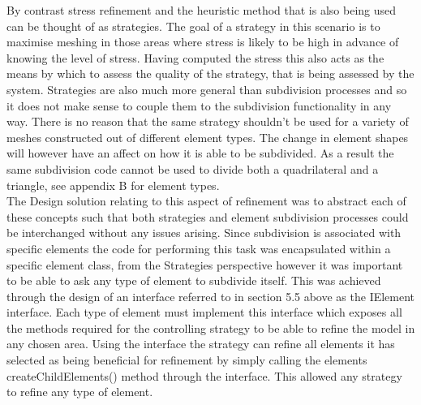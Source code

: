 \noindent
By contrast stress refinement and the heuristic method that is also being used can be thought of as strategies. The goal of a strategy in this scenario is to maximise meshing in those areas where stress is likely to be high in advance of knowing the level of stress. Having computed the stress this also acts as the means by which to assess the quality of the strategy, that is being assessed by the system. Strategies are also much more general than subdivision processes and so it does not make sense to couple them to the subdivision functionality in any way. There is no reason that the same strategy shouldn't be used for a variety of meshes constructed out of different element types. The change in element shapes will however have an affect on how it is able to be subdivided. As a result the same subdivision code cannot be used to divide both a quadrilateral and a triangle, see appendix B for element types. \\ 


\noindent
The Design solution relating to this aspect of refinement was to abstract each of these concepts such that both strategies and element subdivision processes could be interchanged without any issues arising. Since subdivision is associated with specific elements the code for performing this task was encapsulated within a specific element class, from the Strategies perspective however it was important to be able to ask any type of element to subdivide itself. This was achieved through the design of an interface referred to in section 5.5 above as the IElement interface. Each type of element must implement this interface which exposes all the methods required for the controlling strategy to be able to refine the model in any chosen area. Using the interface the strategy can refine all elements it has selected as being beneficial for refinement by simply calling the elements createChildElements() method through the interface. This allowed any strategy to refine any type of element. \\ 


